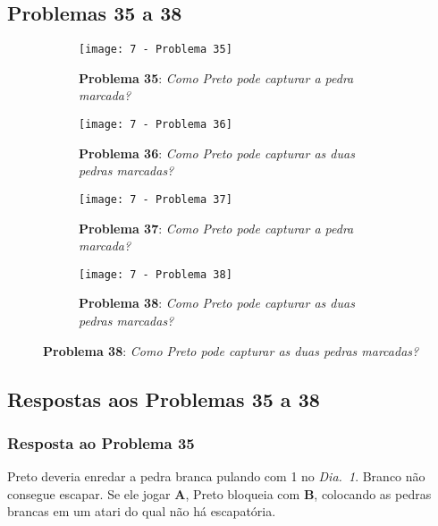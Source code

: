 \pagebreak

\subsection{Problemas 35 a 38}

\begin{figure}[h!]
    \centering
    \captionsetup{justification=raggedright,singlelinecheck=false}
    \begin{subfigure}[t]{.45\textwidth}
        \texttt{[image: 7 - Problema 35]}
        \caption*{\textbf{Problema 35}: \emph{Como Preto pode capturar a pedra marcada?}}
    \end{subfigure}
    \hspace{1cm}
    \begin{subfigure}[t]{.45\textwidth}
        \texttt{[image: 7 - Problema 36]}
        \caption*{\textbf{Problema 36}: \emph{Como Preto pode capturar as duas pedras marcadas?}}
    \end{subfigure}
    \par\bigskip
    \begin{subfigure}[t]{.45\textwidth}
        \texttt{[image: 7 - Problema 37]}
        \caption*{\textbf{Problema 37}: \emph{Como Preto pode capturar a pedra marcada?}}
    \end{subfigure}
    \hspace{1cm}
    \begin{subfigure}[t]{.45\textwidth}
        \texttt{[image: 7 - Problema 38]}
        \caption*{\textbf{Problema 38}: \emph{Como Preto pode capturar as duas pedras marcadas?}}
    \end{subfigure}
\end{figure}

\pagebreak

\subsection{Respostas aos Problemas 35 a 38}

\subsubsection*{Resposta ao Problema 35}

Preto deveria enredar a pedra branca pulando com 1 no \emph{Dia.\@~1}. Branco não consegue escapar. Se ele jogar \textbf{A}, Preto bloqueia com \textbf{B}, colocando as pedras brancas em um atari do qual não há escapatória.

